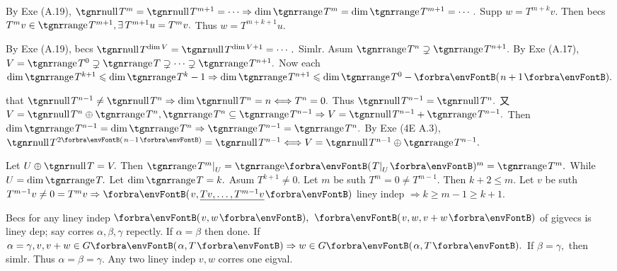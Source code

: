 By Exe (A.19), $\null T^m=\null T^{m+1}=\cdots\Rightarrow\dim\range T^m=\dim\range T^{m+1}=\cdots.$\PfEnd\parSol{}
\Or Supp $w=T^{m+k}v.$ Then becs $T^mv\in\range T^{m+1},\exists\,T^{m+1}u=T^mv.$ Thus $w=T^{m+k+1}u.$\PfEndB
\SepLine

By Exe (A.19), becs $\null T^{\dim V}=\null T^{\dim V+1}=\cdots.$ Simlr.\PfEnd\parSol{}
\Or Asum $\range T^{n}\supsetneq\range T^{n+1}.$ By Exe (A.17), $V=\range T^0\supsetneq\range T\supsetneq\cdots\supsetneq\range T^{n+1}.$\parSol{}
Now each $\dim\range T^{k+1}\leqslant\dim\range T^k-1\Rightarrow\dim\range T^{n+1}\leqslant\dim\range T^0-\Par{n+1}.$\PfEnd
\SepLine\pagebreak

\NOTICE that $\null T^{n-1}\neq\null T^n\Rightarrow\dim\null T^n=n\Longleftrightarrow T^n=0.$ Thus $\null T^{n-1}=\null T^n.$\parSol{}
又 $V=\null T^n\oplus\range T^n,\range T^n\subseteq\range T^{n-1}\Rightarrow V=\null T^{n-1}+\range T^{n-1}.$\parSol{}
\Or Then $\dim\range T^{n-1}=\dim\range T^n\Rightarrow\range T^{n-1}=\range T^n.$\PfEnd\vspace{2pt}\parSol{}
\Or By Exe (4E A.3), $\null T^{2\SmallPar{n-1}}=\null T^{n-1}\Longleftrightarrow V=\null T^{n-1}\oplus\range T^{n-1}.$\PfEnd
\SepLine

Let $U\oplus\null T=V.$ Then $\range T^m\mmid_U=\Range\Par{T\mmid_U}{^m}=\range T^m.$ While $U=\dim\range T.$\PfEnd\parSol{}
\Or Let $\dim\range T=k.$ Asum $T^{k+1}\neq 0.$ Let $m$ be suth $T^m=0\neq T^{m-1}.$ Then $k+2\leqslant m.$\parSol{}
Let $v$ be suth $T^{m-1}v\neq 0=T^mv\Rightarrow\Par{v,{}$\uline{$Tv,\dots,T^{m-1}v$}$}$ liney indep $\Rightarrow k\geqslant m-1\geqslant k+1.$\PfEnd
\SepLine

Becs for any liney indep $\Par{v,w},$ $\Par{v,w,v+w}$ of gigvecs is liney dep; say corres $\alpha,\beta,\gamma$ repectly.\parSol{}
If $\alpha=\beta$ then done. If $\alpha=\gamma,v,v+w\in G\Par{\alpha,T}\Rightarrow w\in G\Par{\alpha,T}.$ If $\beta=\gamma,$ then simlr.\parSol{}
Thus $\alpha=\beta=\gamma.$ Any two liney indep $v,w$ corres one eigval.\PfEndB
\SepLine

